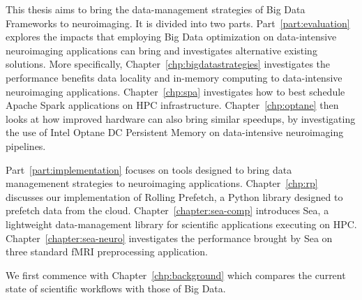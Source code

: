 	This thesis aims to bring the data-management strategies of Big Data
        Frameworks to neuroimaging. It is divided into two parts.
        Part~\ref{part:evaluation} explores the impacts that employing Big
        Data optimization on data-intensive neuroimaging applications can bring
        and investigates alternative existing solutions. More specifically,
        Chapter~\ref{chp:bigdatastrategies} investigates the performance
        benefits data locality and in-memory computing to data-intensive
        neuroimaging applications. Chapter~\ref{chp:spa} investigates how to
        best schedule Apache Spark applications on HPC infrastructure.
        Chapter~\ref{chp:optane} then looks at how improved hardware can also
        bring similar speedups, by investigating the use of Intel Optane DC
        Persistent Memory on data-intensive neuroimaging pipelines.

        Part~\ref{part:implementation} focuses on tools designed to bring
        data managemenent strategies to neuroimaging applications. Chapter~\ref{chp:rp}
        discusses our implementation of Rolling Prefetch, a Python library designed to
        prefetch data from the cloud. Chapter~\ref{chapter:sea-comp} introduces Sea, a lightweight 
        data-management library for scientific applications executing on HPC. Chapter~\ref{chapter:sea-neuro}
        investigates the performance brought by Sea on three standard fMRI preprocessing application.

        We first commence with Chapter~\ref{chp:background} which compares the current state of scientific workflows
        with those of Big Data.


